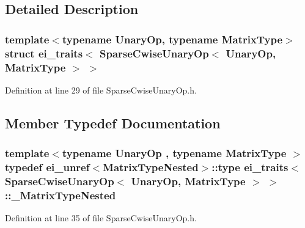 \subsection{Detailed Description}
\subsubsection*{template$<$typename Unary\-Op, typename Matrix\-Type$>$struct ei\-\_\-traits$<$ Sparse\-Cwise\-Unary\-Op$<$ Unary\-Op, Matrix\-Type $>$ $>$}



Definition at line 29 of file Sparse\-Cwise\-Unary\-Op.\-h.



\subsection{Member Typedef Documentation}
\hypertarget{structei__traits_3_01_sparse_cwise_unary_op_3_01_unary_op_00_01_matrix_type_01_4_01_4_a94c434bd45b95ce2a74affa79ec2c186}{
\subsubsection[{\-\_\-\-Matrix\-Type\-Nested}]{\setlength{\rightskip}{0pt plus 5cm}template$<$typename Unary\-Op , typename Matrix\-Type $>$ typedef {\bf ei\-\_\-unref}$<${\bf Matrix\-Type\-Nested}$>$\-::{\bf type} {\bf ei\-\_\-traits}$<$ {\bf Sparse\-Cwise\-Unary\-Op}$<$ Unary\-Op, Matrix\-Type $>$ $>$\-::{\bf \-\_\-\-Matrix\-Type\-Nested}}}\label{structei__traits_3_01_sparse_cwise_unary_op_3_01_unary_op_00_01_matrix_type_01_4_01_4_a94c434bd45b95ce2a74affa79ec2c186}


Definition at line 35 of file Sparse\-Cwise\-Unary\-Op.\-h.

